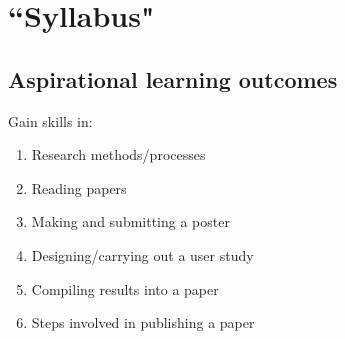 \documentclass[12pt, twocolumn]{article}
\begin{document}
\newpage
\section{``Syllabus"}
\subsection{Aspirational learning outcomes}
Gain skills in:
\begin{enumerate}
	\item Research methods/processes
	\item Reading papers
	\item Making and submitting a poster
	\item Designing/carrying out a user study
	\item Compiling results into a paper
	\item Steps involved in publishing a paper
\end{enumerate}
\end{document}
